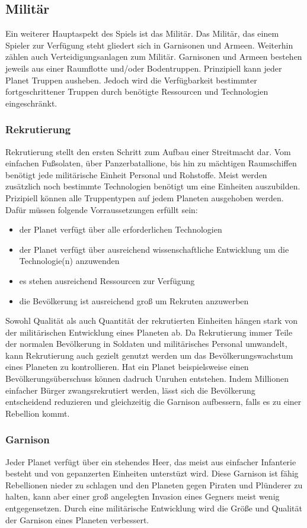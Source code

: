 \documentclass[11pt, a4paper]{article}
\begin{document}
\subsection{Militär}
Ein weiterer Hauptaspekt des Spiels ist das Militär. Das Militär, das einem Spieler zur Verfügung steht
gliedert sich in Garnisonen und Armeen. Weiterhin zählen auch Verteidigungsanlagen zum Militär.
Garnisonen und Armeen bestehen jeweils aus einer Raumflotte und/oder Bodentruppen. Prinzipiell kann jeder
Planet Truppen ausheben. Jedoch wird die Verfügbarkeit bestimmter fortgeschrittener Truppen durch benötigte
Ressourcen und Technologien eingeschränkt.
%
\subsubsection{Rekrutierung}
Rekrutierung stellt den ersten Schritt zum Aufbau einer Streitmacht dar. Vom einfachen Fußsolaten, über
Panzerbatallione, bis hin zu mächtigen Raumschiffen benötigt jede militärische Einheit Personal und Rohstoffe.
Meist werden zusätzlich noch bestimmte Technologien benötigt um eine Einheiten auszubilden. Prizipiell können
alle Truppentypen auf jedem Planeten ausgehoben werden. Dafür müssen folgende Vorraussetzungen erfüllt sein:
\begin{itemize}
	\item der Planet verfügt über alle erforderlichen Technologien
	\item der Planet verfügt über ausreichend wissenschaftliche Entwicklung um die Technologie(n) anzuwenden
	\item es stehen ausreichend Ressourcen zur Verfügung
	\item die Bevölkerung ist ausreichend groß um Rekruten anzuwerben
\end{itemize}
%
Sowohl Qualität als auch Quantität der rekrutierten Einheiten hängen stark von der militärischen Entwicklung
eines Planeten ab. Da Rekrutierung immer Teile der normalen Bevölkerung in Soldaten und militärisches Personal
umwandelt, kann Rekrutierung auch gezielt genutzt werden um das Bevölkerungswachstum eines Planeten zu
kontrollieren. Hat ein Planet beispielsweise einen Bevölkerungsüberschuss können dadruch Unruhen entstehen.
Indem Millionen einfacher Bürger zwangsrekrutiert werden, lässt sich die Bevölkerung entscheidend reduzieren
und gleichzeitig die Garnison aufbessern, falls es zu einer Rebellion kommt.
%
\subsubsection{Garnison}
Jeder Planet verfügt über ein stehendes Heer, das meist aus einfacher Infanterie besteht und von gepanzerten
Einheiten unterstüzt wird. Diese Garnison ist fähig Rebellionen nieder zu schlagen und den Planeten gegen
Piraten und Plünderer zu halten, kann aber einer groß angelegten Invasion eines Gegners meist wenig
entgegensetzen. Durch eine militärische Entwicklung wird die Größe und Qualität der Garnison eines Planeten
verbessert.
%
\end{document}
